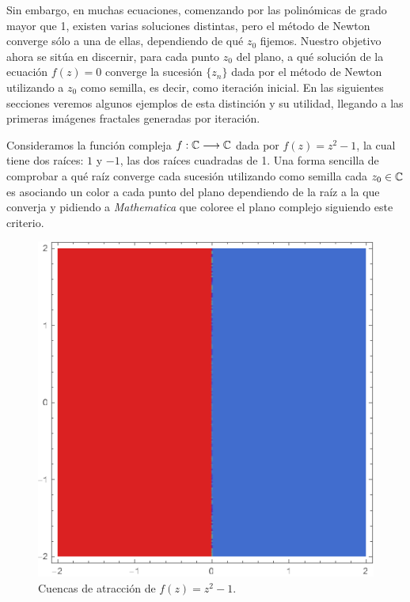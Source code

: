 Sin embargo, en muchas ecuaciones, comenzando por las polinómicas de grado mayor que 1, existen varias soluciones distintas, pero el método de Newton converge sólo a una de ellas, dependiendo de qué $z_0$ fijemos. Nuestro objetivo ahora se sitúa en discernir, para cada punto $z_0$ del plano, a qué solución de la ecuación $f(z)=0$ converge la sucesión $\{z_n\}$ dada por el método de Newton utilizando a $z_0$ como semilla, es decir, como iteración inicial. En las siguientes secciones veremos algunos ejemplos de esta distinción y su utilidad, llegando a las primeras imágenes fractales generadas por iteración.

\begin{ejemplo}
\label{ejemplo:cuencas-1}
Consideramos la función compleja $f:\mathbb{C}\longrightarrow\mathbb{C}$ dada por $f(z)=z^2-1$, la cual tiene dos raíces: $1$ y $-1$, las dos raíces cuadradas de 1. Una forma sencilla de comprobar a qué raíz converge cada sucesión utilizando como semilla cada $z_0\in\mathbb{C}$ es asociando un color a cada punto del plano dependiendo de la raíz a la que converja y pidiendo a \textit{Mathematica} que coloree el plano complejo siguiendo este criterio.


\begin{figure} [ht]
\centering
\includegraphics[scale = 0.4]{img/cuencas-1.png}
\caption{Cuencas de atracción de $f(z)=z^2-1$.}
    \label{fig:cuencas-1}
\end{figure}


\end{ejemplo}
